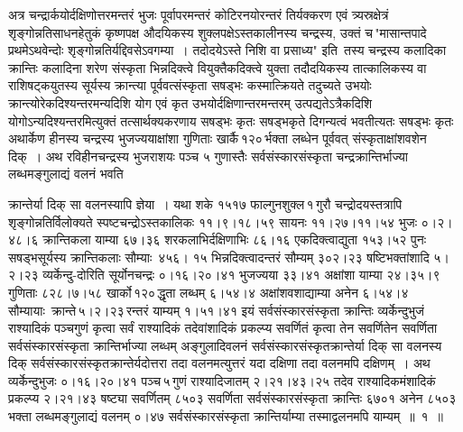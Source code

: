 \documentclass[11pt, openany]{book}
\begin{document}
\begin{sloppypar}
अत्र चन्द्रार्कयोर्दक्षिणोत्तरमन्तरं भुजः पूर्वापरमन्तरं कोटिरनयोरन्तरं तिर्यक्करण एवं त्र्यस्रक्षेत्रं शृङ्गोन्नतिसाधनहेतुकं कृष्णपक्ष औदयिकस्य शुक्लपक्षेऽस्तकालीनस्य चन्द्रस्य, उक्तं च\textendash \,{\color{violet}"मासान्तपादे प्रथमेऽथवेन्दोः शृङ्गोन्नतिर्यद्दिवसेऽवगम्या~। तदोदयेऽस्ते निशि वा प्रसाध्य"} इति~तस्य चन्द्रस्य कलादिका क्रान्तिः कलादिना शरेण संस्कृता भिन्नदिक्त्वे वियुक्तैकदिक्त्वे युक्ता तदौदयिकस्य तात्कालिकस्य वा राशिषट्कयुतस्य सूर्यस्य क्रान्त्या पूर्ववत्संस्कृता सषड्भः कस्मात्क्रियते तदुच्यते उभयोः क्रान्त्योरेकदिश्यन्तरमन्यदिशि योग एवं कृत उभयोर्दक्षिणान्तरमन्तरम् उत्पद्यतेऽत्रैकदिशि योगोऽन्यदिश्यन्तरमित्युक्तं तत्सार्थक्यकरणाय सषड्भः कृतः सषड्भकृते दिगन्यत्वं भवतीत्यतः सषड्भः कृतः अथार्केण हीनस्य चन्द्रस्य भुजज्ययाक्षांशा गुणिताः खार्कै\textendash \,१२०\textendash \,र्भक्ता लब्धेन पूर्ववत् संस्कृताक्षांशवशेन दिक्~। अथ रविहीनचन्द्रस्य भुजराशयः पञ्च ५ गुणास्तैः सर्वसंस्कारसंस्कृता चन्द्रक्रान्तिर्भाज्या लब्धमङ्गुलाद्यं वलनं भवति 
\end{sloppypar}

\newpage

\begin{sloppypar}
\noindent क्रान्तेर्या दिक् सा वलनस्यापि ज्ञेया~। यथा शके १५१७ फाल्गुनशुक्ल\textendash \,१\textendash \,गुरौ चन्द्रोदयस्तत्रापि शृङ्गोन्नतिर्विलोक्यते स्पष्टचन्द्रोऽस्तकालिकः ११।९।१८।५९ सायनः ११।२७।११।५४ भुजः ०।२।४८।६ क्रान्तिकला याम्या ६७।३६ शरकलाभिर्दक्षिणाभिः ८६।१६ एकदिक्त्वाद्युता १५३।५२ पुनः सषड्भसूर्यस्य क्रान्तिकलाः सौम्याः~४५६। १५ भिन्नदिक्त्वादन्तरं सौम्यम् ३०२।२३ षष्टिभक्तांशादि ५।२।२३ व्यर्केन्दु-दोरिति सूर्योनचन्द्रः ०।१६।२०।४१ भुजज्यया ३३।४१ अक्षांशा याम्या २४।३५।९ गुणिताः ८२८।७।५८ खार्को\textendash \,१२०\textendash \,द्धृता लब्धम् ६।५४।४ अक्षांशवशाद्याम्या अनेन ६।५४।४ सौम्यायाः~क्रान्ते\textendash \,५।२।२३\textendash \,रन्तरं याम्यम् १।५१।४१ इयं सर्वसंस्कारसंस्कृता क्रान्तिः व्यर्केन्दुभुजं राश्यादिकं पञ्चगुणं कृत्वा सर्वं राश्यादिकं तदेवांशादिकं प्रकल्प्य सवर्णितं कृत्वा तेन सवर्णितेन सवर्णिता सर्वसंस्कारसंस्कृता क्रान्तिर्भाज्या लब्धम् अङ्गुलादिवलनं सर्वसंस्कारसंस्कृतक्रान्तेर्या दिक् सा वलनस्य दिक् सर्वसंस्कारसंस्कृतक्रान्तेर्यदोत्तरा तदा वलनमत्युत्तरं यदा दक्षिणा तदा वलनमपि दक्षिणम्~। अथ व्यर्केन्दुभुजः ०।१६।२०।४१ पञ्च\textendash \,५\textendash \,गुणं राश्यादिजातम् २।२१।४३।२५ तदेव राश्यादिकमंशादिकं प्रकल्प्य २।२१।४३ षष्ट्या सवर्णितम् ८५०३ सवर्णिता सर्वसंस्कारसंस्कृता क्रान्तिः ६७०१ अनेन ८५०३ भक्ता लब्धमङ्गुलाद्यं वलनम् ०।४७ सर्वसंस्कारसंस्कृता क्रान्तिर्याम्या तस्माद्वलनमपि याम्यम्~॥~१~॥
\end{sloppypar}
\end{document}
